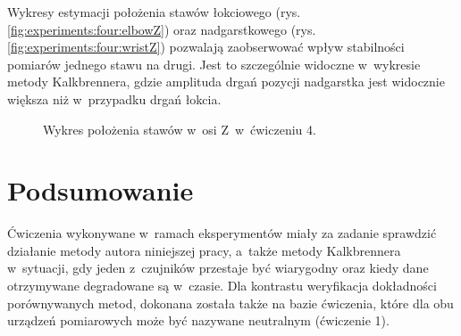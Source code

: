 Wykresy estymacji położenia stawów łokciowego (rys. \ref{fig:experiments:four:elbowZ}) oraz nadgarstkowego (rys. \ref{fig:experiments:four:wristZ}) pozwalają zaobserwować wpływ stabilności pomiarów jednego stawu na drugi. Jest to szczególnie widoczne w~wykresie metody Kalkbrennera, gdzie amplituda drgań pozycji nadgarstka jest widocznie większa niż w~przypadku drgań łokcia. 

\begin{figure}[!htb]
	\centering
	\caption{Wykres położenia stawów w~osi Z~w~ćwiczeniu 4.}	
	\label{fig:experiments:four:Zaxis}
\end{figure}

\section{Podsumowanie}

Ćwiczenia wykonywane w~ramach eksperymentów miały za zadanie sprawdzić działanie metody autora niniejszej pracy, a~także metody Kalkbrennera w~sytuacji, gdy jeden z~czujników przestaje być wiarygodny oraz kiedy dane otrzymywane degradowane są w~czasie. Dla kontrastu weryfikacja dokładności porównywanych metod, dokonana została także na bazie ćwiczenia, które dla obu urządzeń pomiarowych może być nazywane neutralnym (ćwiczenie 1).\\

